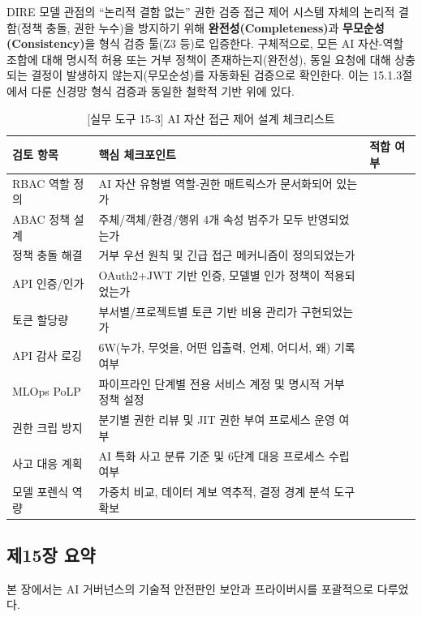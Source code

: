 \begin{practicaltool}{DIRE 모델 관점의 ``논리적 결함 없는'' 권한 검증}
접근 제어 시스템 자체의 논리적 결함(정책 충돌, 권한 누수)을 방지하기 위해 \textbf{완전성(Completeness)}과 \textbf{무모순성(Consistency)}을 형식 검증 툴(Z3 등)로 입증한다. 구체적으로, 모든 AI 자산-역할 조합에 대해 명시적 허용 또는 거부 정책이 존재하는지(완전성), 동일 요청에 대해 상충되는 결정이 발생하지 않는지(무모순성)를 자동화된 검증으로 확인한다. 이는 15.1.3절에서 다룬 신경망 형식 검증과 동일한 철학적 기반 위에 있다.
\end{practicaltool}

\begin{table}[htbp]
\centering
\caption{[실무 도구 15-3] AI 자산 접근 제어 설계 체크리스트}
\label{tab:access_checklist}
\begin{tabularx}{\textwidth}{p{3cm}p{6.5cm}X}
\toprule
\textbf{검토 항목} & \textbf{핵심 체크포인트} & \textbf{적합 여부} \\
\midrule
RBAC 역할 정의 & AI 자산 유형별 역할-권한 매트릭스가 문서화되어 있는가 & \\
ABAC 정책 설계 & 주체/객체/환경/행위 4개 속성 범주가 모두 반영되었는가 & \\
정책 충돌 해결 & 거부 우선 원칙 및 긴급 접근 메커니즘이 정의되었는가 & \\
API 인증/인가 & OAuth2+JWT 기반 인증, 모델별 인가 정책이 적용되었는가 & \\
토큰 할당량 & 부서별/프로젝트별 토큰 기반 비용 관리가 구현되었는가 & \\
API 감사 로깅 & 6W(누가, 무엇을, 어떤 입출력, 언제, 어디서, 왜) 기록 여부 & \\
MLOps PoLP & 파이프라인 단계별 전용 서비스 계정 및 명시적 거부 정책 설정 & \\
권한 크립 방지 & 분기별 권한 리뷰 및 JIT 권한 부여 프로세스 운영 여부 & \\
사고 대응 계획 & AI 특화 사고 분류 기준 및 6단계 대응 프로세스 수립 여부 & \\
모델 포렌식 역량 & 가중치 비교, 데이터 계보 역추적, 결정 경계 분석 도구 확보 & \\
\bottomrule
\end{tabularx}
\end{table}

\subsection*{제15장 요약}

본 장에서는 AI 거버넌스의 기술적 안전판인 보안과 프라이버시를 포괄적으로 다루었다.

